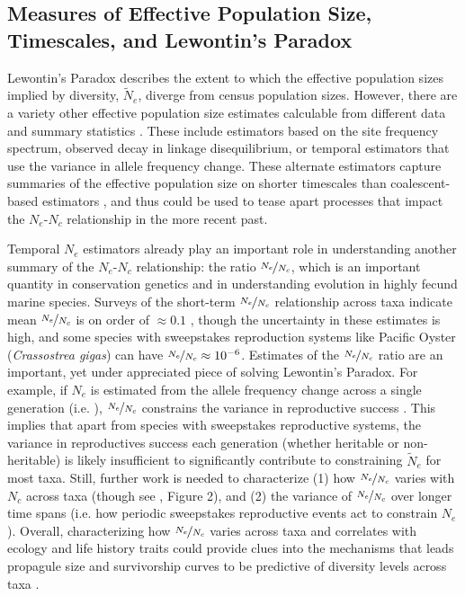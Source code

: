 \documentclass[11pt]{article}
\begin{document}
\subsection*{Measures of Effective Population Size, Timescales, and Lewontin's Paradox}

Lewontin's Paradox describes the extent to which the effective population sizes
implied by diversity, $\widetilde{N}_e$, diverge from census population sizes.
However, there are a variety other effective population size estimates
calculable from different data and summary statistics
\parencite{Wang2016-mi,Caballero1994-ao,Caballero2020-wm,Galtier2020-fb}. These
include estimators based on the site frequency spectrum, observed decay in
linkage disequilibrium, or temporal estimators that use the variance in allele
frequency change. These alternate estimators capture summaries of the effective
population size on shorter timescales than coalescent-based estimators
\parencite{Wang2005-wy}, and thus could be used to tease apart processes that
impact the $N_e$-$N_c$ relationship in the more recent past. 

Temporal $N_e$ estimators already play an important role in understanding
another summary of the $N_e$-$N_c$ relationship: the ratio
$\nicefrac{N_e}{N_c}$, which is an important quantity in conservation genetics
\parencite{Frankham1995-xz,Mace1991-ai} and in understanding evolution in
highly fecund marine species. Surveys of the short-term $\nicefrac{N_e}{N_c}$
relationship across taxa indicate mean $\nicefrac{N_e}{N_c}$ is on order of
$\approx 0.1$ \parencite{Frankham1995-xz,Palstra2008-rt,Palstra2012-vy}, though
the uncertainty in these estimates is high, and some species with sweepstakes
reproduction systems like Pacific Oyster (\emph{Crassostrea gigas}) can have
$\nicefrac{N_e}{N_c} \approx 10^{-6}$. Estimates of the $\nicefrac{N_e}{N_c}$
ratio are an important, yet under appreciated piece of solving Lewontin's
Paradox. For example, if $N_e$ is estimated from the allele frequency change
across a single generation (i.e. \cite{Waples1989-sj}), $\nicefrac{N_e}{N_c}$
constrains the variance in reproductive success
\parencite{Wright1938-tv,Nunney1993-ef,Nunney1996-wy}. This implies that apart
from species with sweepstakes reproductive systems, the variance in
reproductives success each generation (whether heritable or non-heritable) is
likely insufficient to significantly contribute to constraining
$\widetilde{N}_e$ for most taxa. Still, further work is needed to characterize
(1) how $\nicefrac{N_e}{N_c}$ varies with $N_c$ across taxa (though see
\cite{Palstra2012-vy}, Figure 2), and (2) the variance of $\nicefrac{N_e}{N_c}$
over longer time spans (i.e. how periodic sweepstakes reproductive events act
to constrain $N_e$). Overall, characterizing how $\nicefrac{N_e}{N_c}$ varies
across taxa and correlates with ecology and life history traits could provide
clues into the mechanisms that leads propagule size and survivorship curves to
be predictive of diversity levels across taxa
\parencite{Romiguier2014-bp,Hallatschek2018-iu,Barry2020-pp}.
\end{document}
